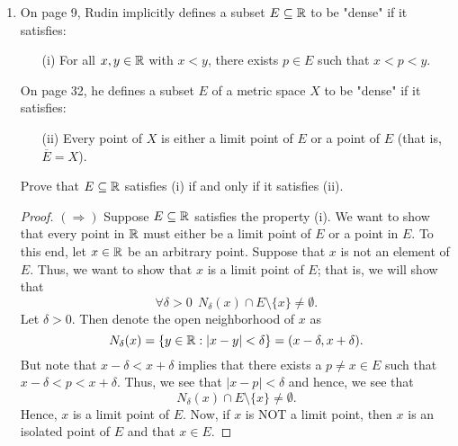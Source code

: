 \documentclass[a4paper]{article}
\begin{document}
\begin{enumerate}
\begin{proof}
    \end{proof}
\item On page 9, Rudin implicitly defines a subset \( E \subseteq \mathbb{R}   \) to be "dense" if it satisfies:
    \begin{enumerate}
        \item[(i)] For all \( x,y \in \mathbb{R}  \) with \( x < y  \), there exists \( p \in E  \) such that \( x < p < y  \).
    \end{enumerate}
    On page 32, he defines a subset \( E  \) of a metric space \( X  \) to be "dense" if it satisfies:
    \begin{enumerate}
        \item[(ii)] Every point of \( X  \) is either a limit point of \( E  \) or a point of \( E  \) (that is, \( \overline{E} = X  \)).
    \end{enumerate}
    Prove that \( E \subseteq \mathbb{R}  \) satisfies (i) if and only if it satisfies (ii).
    \begin{proof}
    \( (\Longrightarrow) \) Suppose \( E \subseteq \mathbb{R}  \) satisfies the property (i). We want to show that every point in \( \mathbb{R}  \) must either be a limit point of \( E  \) or a point in \( E  \). To this end, let \( x \in \mathbb{R}  \) be an arbitrary point. Suppose that \( x  \) is not an element of \( E  \). Thus, we want to show that \( x  \) is a limit point of \( E  \); that is, we will show that 
    \[  \forall \delta > 0 \ \ {N}_{\delta}(x) \cap E \setminus  \{ x  \}  \neq \emptyset. \]
    Let \( \delta > 0 \). Then denote the open neighborhood of \( x  \) as 
    \[  {N}_{\delta}(x) = \{ y \in \mathbb{R} : | x - y | < \delta \} = (x - \delta, x  + \delta).  \]
    But note that \( x - \delta < x + \delta  \) implies that there exists a \( p \neq x  \in E  \) such that \( x - \delta < p < x + \delta \). Thus, we see that \( |  x - p  |  < \delta  \) and hence, we see that 
    \[  {N}_{\delta}(x) \cap E \setminus  \{ x \} \neq \emptyset.  \]
    Hence, \( x  \) is a limit point of \( E  \). Now, if \( x  \) is NOT a limit point, then \( x  \) is an isolated point of \( E  \) and that \(  x \in E  \).
    

\end{proof}
\end{enumerate}
\end{document}
